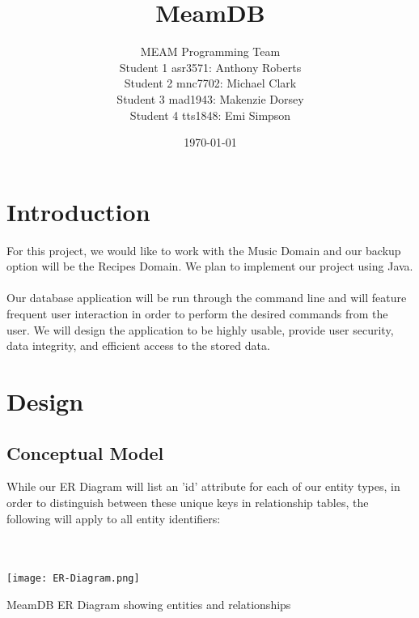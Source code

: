 \documentclass[12pt]{article}
\title{MeamDB}
\date{\today}
\author{MEAM Programming Team \\
Student 1 asr3571: Anthony Roberts\\
Student 2 mnc7702: Michael Clark\\
Student 3 mad1943: Makenzie Dorsey\\
Student 4 tts1848: Emi Simpson\\
}
\begin{document}
    \maketitle

    \section{Introduction}
    For this project, we would like to work with the Music Domain
    and our backup option will be the Recipes Domain. We plan to
    implement our project using Java.
    \\~\\
    \noindent Our database application will be run through the command line
    and will feature frequent user interaction in order to perform the desired
    commands from the user. We will design the application to be highly usable,
    provide user security, data integrity, and efficient access to the stored data.

    \section{Design}
    \subsection{Conceptual Model}
    While our ER Diagram will list an 'id' attribute for each of our entity types,
    in order to distinguish between these unique keys in relationship tables, the
    following will apply to all entity identifiers:

    \\~\\

    \texttt{[image: ER-Diagram.png]}
    \caption{MeamDB ER Diagram showing entities and relationships}
    \label{ER Diagram}
\end{document}
